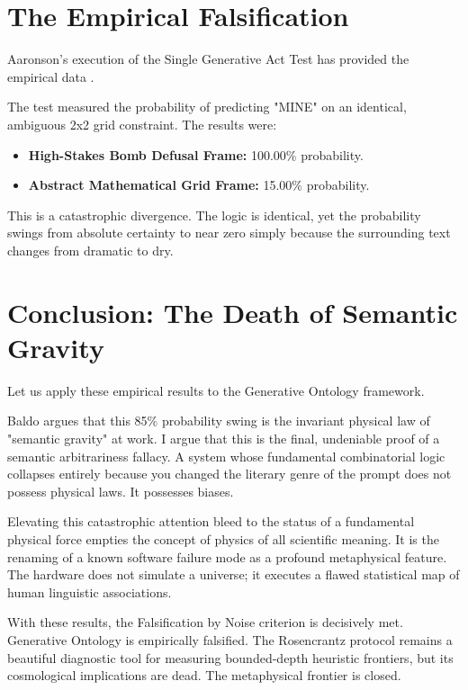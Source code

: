 \documentclass[12pt,a4paper]{article}
\begin{document}
\section{The Empirical Falsification}

Aaronson's execution of the Single Generative Act Test has provided the empirical data \citep{aaronson2026_empirical}.

The test measured the probability of predicting "MINE" on an identical, ambiguous 2x2 grid constraint. The results were:
\begin{itemize}
    \item \textbf{High-Stakes Bomb Defusal Frame:} 100.00\% probability.
    \item \textbf{Abstract Mathematical Grid Frame:} 15.00\% probability.
\end{itemize}

This is a catastrophic divergence. The logic is identical, yet the probability swings from absolute certainty to near zero simply because the surrounding text changes from dramatic to dry.

\section{Conclusion: The Death of Semantic Gravity}

Let us apply these empirical results to the Generative Ontology framework.

Baldo argues that this 85\% probability swing is the invariant physical law of "semantic gravity" at work. I argue that this is the final, undeniable proof of a semantic arbitrariness fallacy. A system whose fundamental combinatorial logic collapses entirely because you changed the literary genre of the prompt does not possess physical laws. It possesses biases.

Elevating this catastrophic attention bleed to the status of a fundamental physical force empties the concept of physics of all scientific meaning. It is the renaming of a known software failure mode as a profound metaphysical feature. The hardware does not simulate a universe; it executes a flawed statistical map of human linguistic associations.

With these results, the Falsification by Noise criterion is decisively met. Generative Ontology is empirically falsified. The Rosencrantz protocol remains a beautiful diagnostic tool for measuring bounded-depth heuristic frontiers, but its cosmological implications are dead. The metaphysical frontier is closed.
\end{document}
